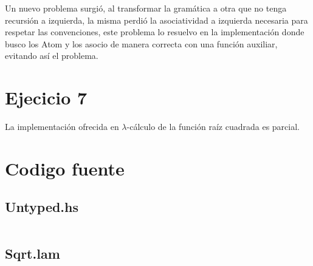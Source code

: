 \documentclass[a4paper,12pt]{article}
\begin{document}
Un nuevo problema surgió, al transformar la gramática a otra que no tenga
recursión a izquierda, la misma perdió la asociatividad a izquierda necesaria para 
respetar las convenciones, este problema lo resuelvo en la implementación 
donde busco los Atom y los asocio de manera correcta con una función auxiliar,
evitando así el problema.

\section*{Ejecicio 7}
La implementación ofrecida en $\lambda$-cálculo de la función raíz cuadrada es parcial.


\newpage
\section*{\centering Codigo fuente}
\subsection*{Untyped.hs}
\inputminted{haskell}{Untyped.hs}
\subsection*{Sqrt.lam}
\inputminted{haskell}{Sqrt.lam}
%
%
\end{document}
